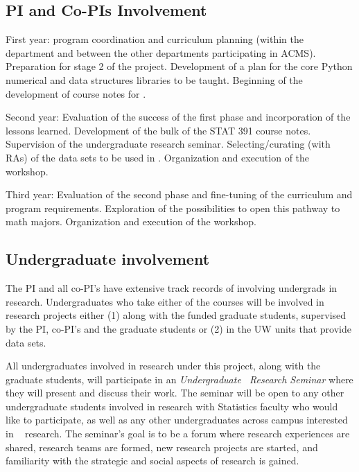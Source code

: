 \subsection{PI and Co-PIs Involvement}

\bits
\item First year: program coordination and curriculum planning (within the department and between the other departments participating in ACMS). Preparation for stage 2 of the project. 
Development of a plan for the core Python numerical and data structures libraries to be taught.
Beginning of the development of course notes for \statcl.

\item Second year: Evaluation of the success of the first phase and
  incorporation of the lessons learned. Development of the bulk of the STAT 391 course
  notes. Supervision of  the undergraduate research seminar. 
 Selecting/curating  (with RAs) of the data sets to be used in
  \statcl. Organization and execution of the workshop. 

\item Third year: Evaluation of the second phase and fine-tuning of
  the curriculum and program requirements. Exploration of the possibilities to
  open this pathway to math majors. Organization and execution of the workshop. 
 \eits

\subsection{Undergraduate involvement}
\label{sec:ugrad-seminar}
The PI and all co-PI's have extensive track records of involving
undergrads in research. Undergraduates who take either of the courses will be involved in
research projects either (1) along with the funded graduate students,
supervised by the PI, co-PI's and the graduate students or (2) in the
UW units that provide data sets.

All undergraduates involved in research under this project, along with
the graduate students, will participate in an {\em Undergraduate
\cdse\  Research Seminar} where they will present and
discuss their work.  
The seminar will be open to any other undergraduate students involved
in research with Statistics faculty who would like to participate, as
well as any other undergraduates across campus interested in \cdse~
research. The seminar's goal is to be a forum where research
experiences are shared, research teams are formed, new research
projects are started, and familiarity with the strategic and social
aspects of research is gained. 

